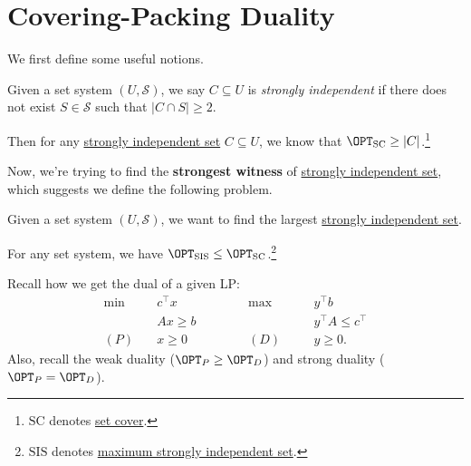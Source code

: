 \section{Covering-Packing Duality}
We first define some useful notions.
\begin{definition}\label{def:strongly-independent}
	Given a set system \((U, \mathcal{S} )\), we say \(C\subseteq U\) is \emph{strongly independent} if there does not exist \(S\in \mathcal{S} \) such that \(\left\vert C \cap S \right\vert \geq 2\).
\end{definition}

\begin{remark}
	Then for any \hyperref[def:strongly-independent]{strongly independent set} \(C\subseteq U\), we know that \(\OPT_{\mathrm{SC}} \geq \left\vert C \right\vert\).\footnote{\(\mathrm{SC}\) denotes \hyperref[prb:set-cover]{set cover}.}
\end{remark}

Now, we're trying to find the \textbf{strongest witness} of \hyperref[def:strongly-independent]{strongly independent set}, which suggests we define the following problem.

\begin{problem}\label{prb:max-strongly-independent-set}
Given a set system \((U, \mathcal{S} )\), we want to find the largest \hyperref[def:strongly-independent]{strongly independent set}.
\end{problem}

\begin{remark}
	For any set system, we have \(\OPT_{\mathrm{SIS}}\leq \OPT_{\mathrm{SC}}\).\footnote{\(\mathrm{SIS}\) denotes \hyperref[prb:max-strongly-independent-set]{maximum strongly independent set}.}
\end{remark}

\begin{prev}[LP dual]
	Recall how we get the dual of a given LP:
	\[
		\begin{alignedat}{5}
			\min~    & c^{\top}x\qquad\qquad &  & \max ~   &  & y^{\top} b              \\
			         & Ax \geq b             &  &          &  & y^{\top} A\leq c^{\top} \\
			(P)\quad & x\geq  0              &  & (D)\quad &  & y\geq 0.
		\end{alignedat}
	\]
	Also, recall the weak duality (\(\OPT_{P} \geq \OPT_D\)) and strong duality (\(\OPT_P = \OPT_D\)).
\end{prev}

